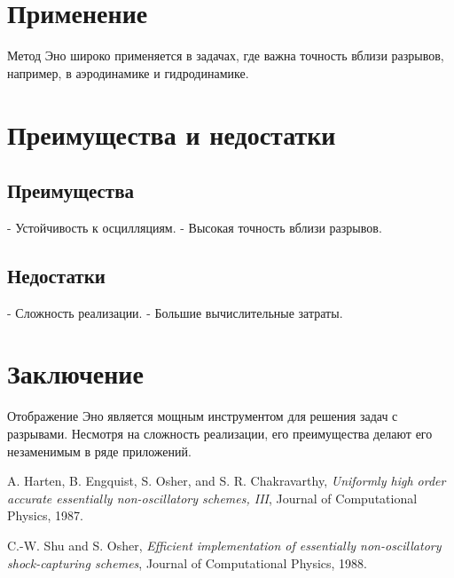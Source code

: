 \documentclass[a4paper,12pt]{article}
\begin{document}
\section{Применение}
Метод Эно широко применяется в задачах, где важна точность вблизи разрывов, например, в аэродинамике и гидродинамике.

\section{Преимущества и недостатки}
\subsection{Преимущества}
- Устойчивость к осцилляциям.
- Высокая точность вблизи разрывов.

\subsection{Недостатки}
- Сложность реализации.
- Большие вычислительные затраты.

\section{Заключение}
Отображение Эно является мощным инструментом для решения задач с разрывами. Несмотря на сложность реализации, его преимущества делают его незаменимым в ряде приложений.

\begin{thebibliography}{9}
A. Harten, B. Engquist, S. Osher, and S. R. Chakravarthy, \textit{Uniformly high order accurate essentially non-oscillatory schemes, III}, Journal of Computational Physics, 1987.

C.-W. Shu and S. Osher, \textit{Efficient implementation of essentially non-oscillatory shock-capturing schemes}, Journal of Computational Physics, 1988.
\end{thebibliography}
\end{document}
